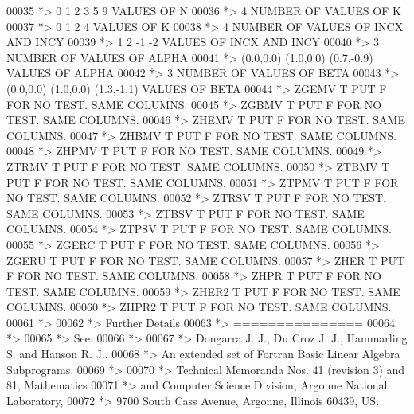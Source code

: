 \begin{DoxyCode}
00035 \textcolor{comment}{*> 0 1 2 3 5 9       VALUES OF N}
00036 \textcolor{comment}{*> 4                 NUMBER OF VALUES OF K}
00037 \textcolor{comment}{*> 0 1 2 4           VALUES OF K}
00038 \textcolor{comment}{*> 4                 NUMBER OF VALUES OF INCX AND INCY}
00039 \textcolor{comment}{*> 1 2 -1 -2         VALUES OF INCX AND INCY}
00040 \textcolor{comment}{*> 3                 NUMBER OF VALUES OF ALPHA}
00041 \textcolor{comment}{*> (0.0,0.0) (1.0,0.0) (0.7,-0.9)       VALUES OF ALPHA}
00042 \textcolor{comment}{*> 3                 NUMBER OF VALUES OF BETA}
00043 \textcolor{comment}{*> (0.0,0.0) (1.0,0.0) (1.3,-1.1)       VALUES OF BETA}
00044 \textcolor{comment}{*> ZGEMV  T PUT F FOR NO TEST. SAME COLUMNS.}
00045 \textcolor{comment}{*> ZGBMV  T PUT F FOR NO TEST. SAME COLUMNS.}
00046 \textcolor{comment}{*> ZHEMV  T PUT F FOR NO TEST. SAME COLUMNS.}
00047 \textcolor{comment}{*> ZHBMV  T PUT F FOR NO TEST. SAME COLUMNS.}
00048 \textcolor{comment}{*> ZHPMV  T PUT F FOR NO TEST. SAME COLUMNS.}
00049 \textcolor{comment}{*> ZTRMV  T PUT F FOR NO TEST. SAME COLUMNS.}
00050 \textcolor{comment}{*> ZTBMV  T PUT F FOR NO TEST. SAME COLUMNS.}
00051 \textcolor{comment}{*> ZTPMV  T PUT F FOR NO TEST. SAME COLUMNS.}
00052 \textcolor{comment}{*> ZTRSV  T PUT F FOR NO TEST. SAME COLUMNS.}
00053 \textcolor{comment}{*> ZTBSV  T PUT F FOR NO TEST. SAME COLUMNS.}
00054 \textcolor{comment}{*> ZTPSV  T PUT F FOR NO TEST. SAME COLUMNS.}
00055 \textcolor{comment}{*> ZGERC  T PUT F FOR NO TEST. SAME COLUMNS.}
00056 \textcolor{comment}{*> ZGERU  T PUT F FOR NO TEST. SAME COLUMNS.}
00057 \textcolor{comment}{*> ZHER   T PUT F FOR NO TEST. SAME COLUMNS.}
00058 \textcolor{comment}{*> ZHPR   T PUT F FOR NO TEST. SAME COLUMNS.}
00059 \textcolor{comment}{*> ZHER2  T PUT F FOR NO TEST. SAME COLUMNS.}
00060 \textcolor{comment}{*> ZHPR2  T PUT F FOR NO TEST. SAME COLUMNS.}
00061 \textcolor{comment}{*>}
00062 \textcolor{comment}{*> Further Details}
00063 \textcolor{comment}{*> ===============}
00064 \textcolor{comment}{*>}
00065 \textcolor{comment}{*>    See:}
00066 \textcolor{comment}{*>}
00067 \textcolor{comment}{*>       Dongarra J. J., Du Croz J. J., Hammarling S.  and Hanson R. J..}
00068 \textcolor{comment}{*>       An  extended  set of Fortran  Basic Linear Algebra Subprograms.}
00069 \textcolor{comment}{*>}
00070 \textcolor{comment}{*>       Technical  Memoranda  Nos. 41 (revision 3) and 81,  Mathematics}
00071 \textcolor{comment}{*>       and  Computer Science  Division,  Argonne  National Laboratory,}
00072 \textcolor{comment}{*>       9700 South Cass Avenue, Argonne, Illinois 60439, US.}

\end{DoxyCode}
